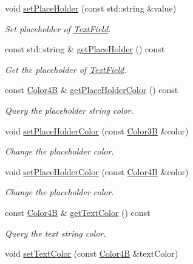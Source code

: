 \begin{DoxyCompactItemize}
\item 
void \hyperlink{classui_1_1TextField_a6b31c82b05591b783f1a0f6e1cbc5802}{set\+Place\+Holder} (const std\+::string \&value)
\begin{DoxyCompactList}\small\item\em Set placeholder of \hyperlink{classui_1_1TextField}{Text\+Field}. \end{DoxyCompactList}\item 
const std\+::string \& \hyperlink{classui_1_1TextField_ade85e9d25d7f7aee1aa656d1ea1b7990}{get\+Place\+Holder} () const
\begin{DoxyCompactList}\small\item\em Get the placeholder of \hyperlink{classui_1_1TextField}{Text\+Field}. \end{DoxyCompactList}\item 
const \hyperlink{structColor4B}{Color4B} \& \hyperlink{classui_1_1TextField_a9ee14d4839a1fc60aeb26ea37edd76f0}{get\+Place\+Holder\+Color} () const
\begin{DoxyCompactList}\small\item\em Query the placeholder string color. \end{DoxyCompactList}\item 
void \hyperlink{classui_1_1TextField_a64bf3054d1aa45eeea0dd3b01b953c50}{set\+Place\+Holder\+Color} (const \hyperlink{structColor3B}{Color3B} \&color)
\begin{DoxyCompactList}\small\item\em Change the placeholder color. \end{DoxyCompactList}\item 
void \hyperlink{classui_1_1TextField_acfd23c7de3ad8725aedac1f770230283}{set\+Place\+Holder\+Color} (const \hyperlink{structColor4B}{Color4B} \&color)
\begin{DoxyCompactList}\small\item\em Change the placeholder color. \end{DoxyCompactList}\item 
const \hyperlink{structColor4B}{Color4B} \& \hyperlink{classui_1_1TextField_ad600c0cf6492150b1f7fd736540f6aa7}{get\+Text\+Color} () const
\begin{DoxyCompactList}\small\item\em Query the text string color. \end{DoxyCompactList}\item 
void \hyperlink{classui_1_1TextField_a9eb575bdd0cfb182d591b90b8aab7b68}{set\+Text\+Color} (const \hyperlink{structColor4B}{Color4B} \&text\+Color)

\end{DoxyCompactItemize}
